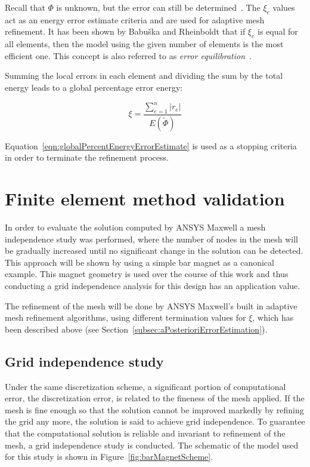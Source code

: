 Recall that $\Phi$ is unknown, but the error can still be determined~\cite{Cendes1985}. The $\xi_{e}$ values act as an energy error estimate criteria and are used for adaptive mesh refinement. It has been shown by Babu\v{s}ka and Rheinboldt that if $\xi_{e}$ is equal for all elements, then the model using the given number of elements is the most efficient one. This concept is also referred to as \emph{error equilibration}~\cite{Babuska1979_2}.

Summing the local errors in each element and dividing the sum by the total energy leads to a global percentage error energy:

\begin{equation}
	\xi = \frac{\sum_{e=1}^{n}|r_{e}|}{E(\tilde{\Phi})}
	\label{eqn:globalPercentEnergyErrorEstimate}
\end{equation}

Equation~\ref{eqn:globalPercentEnergyErrorEstimate} is used as a stopping criteria in order to terminate the refinement process. 

\section{Finite element method validation}\label{sec:femValidation}
In order to evaluate the solution computed by ANSYS Maxwell a mesh independence study was performed, where the number of nodes in the mesh will be gradually increased until no significant change in the solution can be detected. This approach will be shown by using a simple bar magnet as a canonical example. This magnet geometry is used over the course of this work and thus conducting a grid independence analysis for this design has an application value.

The refinement of the mesh will be done by ANSYS Maxwell's built in adaptive mesh refinement algorithms, using different termination values for $\xi$, which has been described above (see Section~\ref{subsec:aPosterioriErrorEstimation}).


\subsection{Grid independence study}
\label{subsec:gridIndependenceStudy}
Under the same discretization scheme, a significant portion of computational error, the discretization error, is related to the fineness of the mesh applied. If the mesh is fine enough so that the solution cannot be improved markedly by refining the grid any more, the solution is said to achieve grid independence. To guarantee that the computational solution is reliable and invariant to refinement of the mesh, a grid independence study is conducted. The schematic of the model used for this study is shown in Figure~\ref{fig:barMagnetScheme}.

